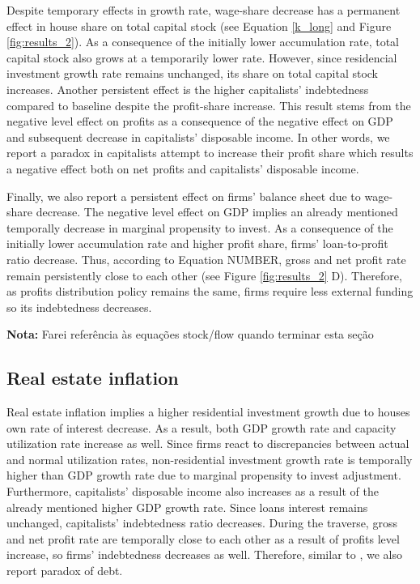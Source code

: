 \documentclass[11pt]{article}
\begin{document}
Despite temporary effects in growth rate, wage-share decrease has a permanent effect in house share on total capital stock (see Equation \ref{k_long} and Figure \ref{fig:results_2}).
As a consequence of the initially lower accumulation rate, total capital stock also grows at a temporarily lower rate.
However, since residencial investment growth rate remains unchanged, its share on total capital stock increases.
Another persistent effect is the higher capitalists' indebtedness compared to baseline despite the profit-share increase.
This result stems from the negative level effect on profits as a consequence of the negative effect on GDP and subsequent decrease in capitalists' disposable income.
In other words, we report a paradox in capitalists attempt to increase their profit share which results a negative effect both on net profits and capitalists' disposable income.

Finally, we also report a persistent effect on firms' balance sheet due to wage-share decrease.
The negative level effect on GDP implies an already mentioned temporally decrease in marginal propensity to invest.
As a consequence of the initially lower accumulation rate and higher profit share, firms' loan-to-profit ratio decrease.
Thus, according to Equation NUMBER, gross and net profit rate remain persistently close to each other (see Figure \ref{fig:results_2} D).
Therefore, as profits distribution policy remains the same, firms require less external funding so its indebtedness decreases.

\textbf{Nota:} Farei referência às equações stock/flow quando terminar esta seção

\subsection{Real estate inflation}
\label{sec:orga3eddb5}
\label{sec:Exp2}


Real estate inflation implies a higher residential investment growth due to houses own rate of interest decrease.
As a result, both GDP growth rate and capacity utilization rate increase as well.
Since firms react to discrepancies between actual and normal utilization rates, non-residential investment growth rate 
is temporally higher than GDP growth rate due to marginal propensity to invest adjustment.
Furthermore, capitalists' disposable income also increases as a result of the already mentioned higher GDP growth rate.
Since loans interest remains unchanged, capitalists' indebtedness ratio decreases.
During the traverse, gross and net profit rate are temporally close to each other as a result of profits level increase, so firms' indebtedness decreases as well.
Therefore, similar to \textcite{mandarino-2020-worker-debt}, we also report paradox of debt.
\end{document}
